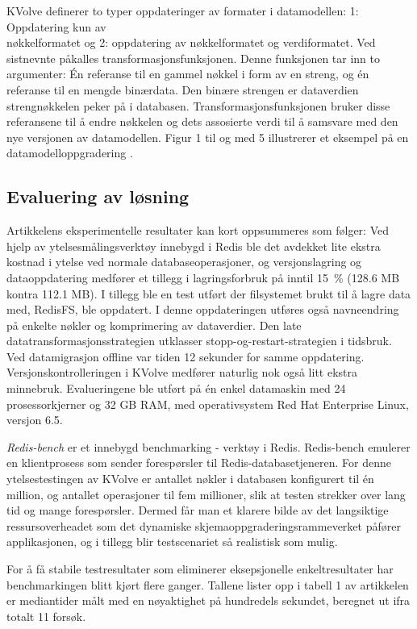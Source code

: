KVolve definerer to typer oppdateringer av formater i datamodellen: 1: Oppdatering kun av \\ nøkkelformatet og 2: oppdatering av nøkkelformatet og verdiformatet. Ved sistnevnte påkalles transformasjonsfunksjonen. Denne funksjonen tar inn to argumenter: Én referanse til en gammel nøkkel i form av en streng, og én referanse til en mengde binærdata. Den binære strengen er dataverdien strengnøkkelen peker på i databasen. Transformasjonsfunksjonen bruker disse referansene til å endre nøkkelen og dets assosierte verdi til å samsvare med den nye versjonen av datamodellen. Figur 1 til og med 5 illustrerer et eksempel på en datamodelloppgradering \citep{saur2016}.

\subsection{Evaluering av løsning}
Artikkelens eksperimentelle resultater kan kort oppsummeres som følger: Ved hjelp av ytelsesmålingsverktøy innebygd i Redis ble det avdekket lite ekstra kostnad i ytelse ved normale databaseoperasjoner, og versjonslagring og dataoppdatering medfører et tillegg i lagringsforbruk på inntil 15~\% (128.6 MB kontra 112.1 MB). I tillegg ble en test utført der filsystemet brukt til å lagre data med, RedisFS, ble oppdatert. I denne oppdateringen utføres også navneendring på enkelte nøkler og komprimering av dataverdier. Den late datatransformasjonsstrategien utklasser stopp-og-restart-strategien i tidsbruk. Ved datamigrasjon offline var tiden 12 sekunder for samme oppdatering. Versjonskontrolleringen i KVolve medfører naturlig nok også litt ekstra minnebruk. Evalueringene ble utført på én enkel datamaskin med 24 prosessorkjerner og 32 GB RAM, med operativsystem Red Hat Enterprise Linux, versjon 6.5.

\emph{Redis-bench} er et innebygd benchmarking - verktøy i Redis. Redis-bench emulerer en klientprosess som sender forespørsler til Redis-databasetjeneren. For denne ytelsestestingen av KVolve er antallet nøkler i databasen konfigurert til én million, og antallet operasjoner til fem millioner, slik at testen strekker over lang tid og mange forespørsler. Dermed får man et klarere bilde av det langsiktige ressursoverheadet som det dynamiske skjemaoppgraderingsrammeverket påfører applikasjonen, og i tillegg blir testscenariet så realistisk som mulig.

For å få stabile testresultater som eliminerer eksepsjonelle enkeltresultater har benchmarkingen blitt kjørt flere ganger. Tallene \cite{saur2016} lister opp i tabell 1 av artikkelen er mediantider målt med en nøyaktighet på hundredels sekundet, beregnet ut ifra totalt 11 forsøk.

